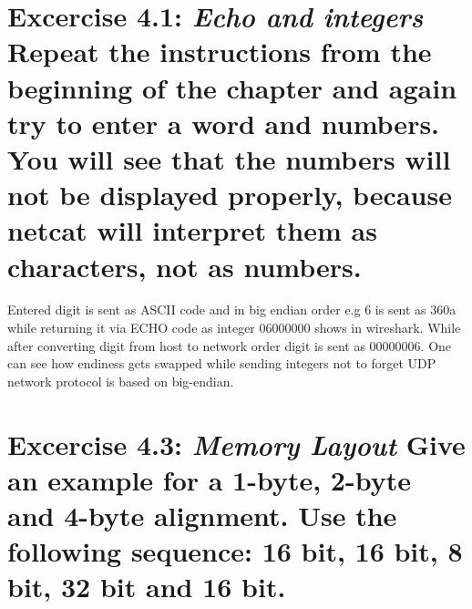 \documentclass[11pt]{article} %
\begin{document}
\section*{Excercise 4.1: \textnormal{\large{\textit{Echo and integers} Repeat the instructions from the beginning
of the chapter and again try to enter a word and numbers. You will see that
the numbers will not be displayed properly, because netcat will interpret them as
characters, not as numbers.}}}

Entered digit is sent as ASCII code and in big endian order e.g 6 is sent as 360a
while returning it via ECHO code as integer 06000000 shows in wireshark. 
While after converting digit from host to network order digit is sent as 00000006.
One can see how endiness gets swapped while sending integers not to forget UDP network protocol is based on big-endian.


\section*{Excercise 4.3: \textnormal{\large{\textit{Memory Layout} Give an example for a 1-byte, 2-byte and 4-byte
alignment. Use the following sequence: 16 bit, 16 bit, 8 bit, 32 bit and 16 bit.}}}
\end{document}
